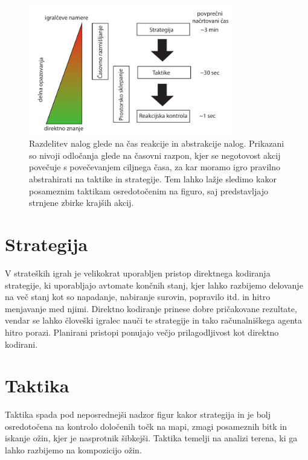 \documentclass[a4paper, 12pt]{book}
\begin{document}
\begin{itemize}
	\begin{figure}[h!]
		\begin{center}
			\includegraphics[width=0.8\textwidth]{photos/RazdelitevNalog.pdf}
		\end{center}
		\caption{Razdelitev nalog glede na čas reakcije in abstrakcije nalog. 
			Prikazani so nivoji odločanja glede na časovni razpon, kjer se negotovost akcij povečuje s povečevanjem ciljnega časa, za kar moramo igro pravilno abstrahirati na taktike in strategije. 
			Tem lahko lažje sledimo kakor posameznim taktikam osredotočenim na figuro, saj predstavljajo strnjene zbirke krajših akcij. }
		\label{picRazdelitevNalog}
	\end{figure}
\end{itemize}

\section{Strategija}
V strateških igrah je velikokrat uporabljen pristop direktnega kodiranja strategije, ki uporabljajo avtomate končnih stanj, kjer lahko razbijemo delovanje na več stanj kot so napadanje, nabiranje surovin, popravilo itd. in hitro menjavanje med njimi. 
Direktno kodiranje prinese dobre pričakovane rezultate, vendar se lahko človeški igralec nauči te strategije in tako računalniškega agenta hitro porazi.
Planirani pristopi ponujajo večjo prilagodljivost kot direktno kodirani.
\section{Taktika}
Taktika spada pod neposrednejši nadzor figur kakor strategija in je bolj osredotočena na kontrolo določenih točk na mapi, zmagi posameznih bitk in iskanje ožin, kjer je nasprotnik šibkejši. 
Taktika temelji na analizi terena, ki ga lahko razbijemo na kompozicijo ožin.
\end{document}
